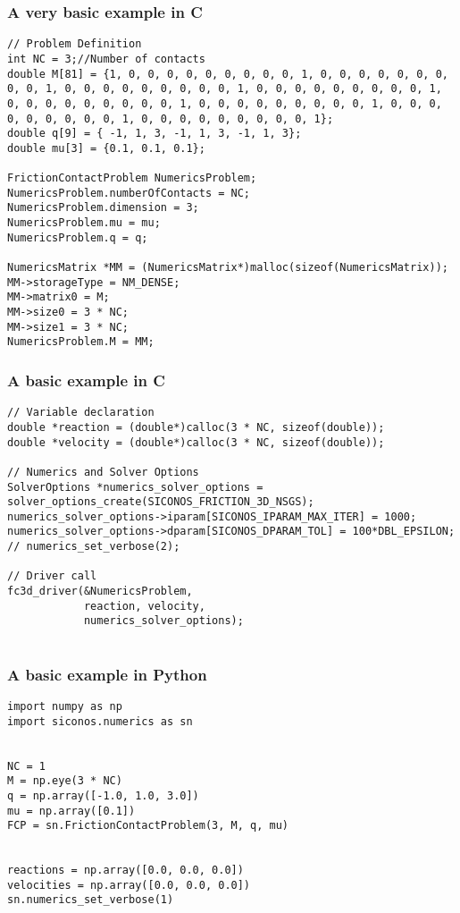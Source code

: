 \begin{frame}[fragile]
  \frametitle{A very basic example in C}
    {\small
      \begin{verbatim}
// Problem Definition
int NC = 3;//Number of contacts
double M[81] = {1, 0, 0, 0, 0, 0, 0, 0, 0, 0, 1, 0, 0, 0, 0, 0, 0, 0, 0, 0, 1, 0, 0, 0, 0, 0, 0, 0, 0, 0, 1, 0, 0, 0, 0, 0, 0, 0, 0, 0, 1, 0, 0, 0, 0, 0, 0, 0, 0, 0, 1, 0, 0, 0, 0, 0, 0, 0, 0, 0, 1, 0, 0, 0, 0, 0, 0, 0, 0, 0, 1, 0, 0, 0, 0, 0, 0, 0, 0, 0, 1};
double q[9] = { -1, 1, 3, -1, 1, 3, -1, 1, 3};
double mu[3] = {0.1, 0.1, 0.1};

FrictionContactProblem NumericsProblem;
NumericsProblem.numberOfContacts = NC;
NumericsProblem.dimension = 3;
NumericsProblem.mu = mu;
NumericsProblem.q = q;

NumericsMatrix *MM = (NumericsMatrix*)malloc(sizeof(NumericsMatrix));
MM->storageType = NM_DENSE;
MM->matrix0 = M;
MM->size0 = 3 * NC;
MM->size1 = 3 * NC;
NumericsProblem.M = MM;
\end{verbatim}
}
\end{frame}
  
\begin{frame}[fragile]
  \frametitle{A basic example in C}
    {\small
      \begin{verbatim}
// Variable declaration
double *reaction = (double*)calloc(3 * NC, sizeof(double));
double *velocity = (double*)calloc(3 * NC, sizeof(double));

// Numerics and Solver Options
SolverOptions *numerics_solver_options = solver_options_create(SICONOS_FRICTION_3D_NSGS);
numerics_solver_options->iparam[SICONOS_IPARAM_MAX_ITER] = 1000;
numerics_solver_options->dparam[SICONOS_DPARAM_TOL] = 100*DBL_EPSILON;
// numerics_set_verbose(2);

// Driver call
fc3d_driver(&NumericsProblem,
            reaction, velocity,
            numerics_solver_options);
        
      \end{verbatim}
    }
  \end{frame}

\begin{frame}[fragile]
  \frametitle{A basic example in Python}
    {\small
      \begin{verbatim}
import numpy as np
import siconos.numerics as sn


NC = 1
M = np.eye(3 * NC)
q = np.array([-1.0, 1.0, 3.0])
mu = np.array([0.1])
FCP = sn.FrictionContactProblem(3, M, q, mu)


reactions = np.array([0.0, 0.0, 0.0])
velocities = np.array([0.0, 0.0, 0.0])
sn.numerics_set_verbose(1)

      \end{verbatim}
    }
  \end{frame}


